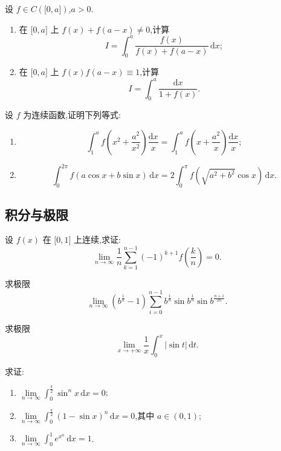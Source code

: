 \documentclass[../数学分析培优讲义.tex]{subfiles}
\begin{document}
\begin{example}
设 $f\in C(\lbrack 0,a\rbrack)$,$a>0$.
\begin{enumerate}[label=(\arabic*)]
    \item 在 $\lbrack 0,a\rbrack$ 上 $f(x)+f(a-x)\neq0$,计算
    \[
        I=\int_0^a\dfrac{f(x)}{f(x)+f(a-x)}\,\mathrm{d}x;
    \]
    \item 在 $\lbrack 0,a\rbrack$ 上 $f(x)f(a-x)\equiv1$,计算
    \[
        I=\int_0^a\dfrac{\mathrm{d}x}{1+f(x)}.
    \]
\end{enumerate}
\end{example}
\exampleblank

\begin{example}
设 $f$ 为连续函数,证明下列等式:
\begin{enumerate}[label=(\arabic*)]
    \item
    \[
        \int_1^a f\left(x^2+\dfrac{a^2}{x^2}\right)\dfrac{\mathrm{d}x}{x}
        =\int_1^a f\left(x+\dfrac{a^2}{x}\right)\dfrac{\mathrm{d}x}{x};
    \]
    \item
    \[
        \int_0^{2\pi}f(a\cos x+b\sin x)\,\mathrm{d}x
        =2\int_0^\pi f\left(\sqrt{a^2+b^2}\cos x\right)\,\mathrm{d}x.
    \]
\end{enumerate}
\end{example}
\exampleblank


\newpage

\subsection{积分与极限}

\begin{example}
设 $f(x)$ 在 $\lbrack 0,1\rbrack$ 上连续,求证:
\[
    \lim\limits_{n\to\infty}\dfrac{1}{n}
    \sum\limits_{k=1}^{n-1}(-1)^{k+1}f\left(\dfrac{k}{n}\right)=0.
\]
\end{example}
\exampleblank

\begin{example}
求极限
\[
    \lim\limits_{n\to\infty}
    \left(b^{\frac{1}{n}}-1\right)
    \sum\limits_{i=0}^{n-1}
    b^{\frac{1}{n}}\sin b^{\frac{1}{n}}
    \sin b^{\frac{n+1}{2n}}.
\]
\end{example}
\exampleblank

\begin{example}
求极限
\[
    \lim\limits_{x\to+\infty}\dfrac{1}{x}\int_0^x|\sin t|\,\mathrm{d}t.
\]
\end{example}
\exampleblank

\begin{example}
求证:
\begin{enumerate}[label=(\arabic*)]
    \item $\displaystyle\lim\limits_{n\to\infty}\int_0^{\frac{\pi}{2}}\sin^n x\,\mathrm{d}x=0$;
    \item $\displaystyle\lim\limits_{n\to\infty}\int_0^{\frac{\pi}{2}}(1-\sin x)^n\,\mathrm{d}x=0$,其中 $a\in(0,1)$;
    \item $\displaystyle\lim\limits_{n\to\infty}\int_0^1e^{x^n}\,\mathrm{d}x=1$.
\end{enumerate}
\end{example}
\exampleblank
\end{document}
